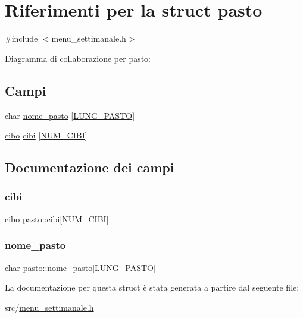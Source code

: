 \hypertarget{structpasto}{}\section{Riferimenti per la struct pasto}
\label{structpasto}


{\ttfamily \#include $<$menu\+\_\+settimanale.\+h$>$}



Diagramma di collaborazione per pasto\+:
\subsection*{Campi}
\begin{DoxyCompactItemize}
\item 
char \hyperlink{structpasto_a64f639335ea116474fb622593a998e94}{nome\+\_\+pasto} \mbox{[}\hyperlink{menu__settimanale_8h_ab1b0c8053eda8a811aae87dd756b1530}{L\+U\+N\+G\+\_\+\+P\+A\+S\+TO}\mbox{]}
\item 
\hyperlink{structcibo}{cibo} \hyperlink{structpasto_a616bde7d807aaa730ddb150de7a96296}{cibi} \mbox{[}\hyperlink{menu__settimanale_8h_a70afbf8b7e7e8486fdec619990ec6073}{N\+U\+M\+\_\+\+C\+I\+BI}\mbox{]}
\end{DoxyCompactItemize}


\subsection{Documentazione dei campi}
\mbox{\label{structpasto_a616bde7d807aaa730ddb150de7a96296}} 
\subsubsection{\texorpdfstring{cibi}{cibi}}
{\footnotesize\ttfamily \hyperlink{structcibo}{cibo} pasto\+::cibi\mbox{[}\hyperlink{menu__settimanale_8h_a70afbf8b7e7e8486fdec619990ec6073}{N\+U\+M\+\_\+\+C\+I\+BI}\mbox{]}}

\mbox{\label{structpasto_a64f639335ea116474fb622593a998e94}} 
\subsubsection{\texorpdfstring{nome\+\_\+pasto}{nome\_pasto}}
{\footnotesize\ttfamily char pasto\+::nome\+\_\+pasto\mbox{[}\hyperlink{menu__settimanale_8h_ab1b0c8053eda8a811aae87dd756b1530}{L\+U\+N\+G\+\_\+\+P\+A\+S\+TO}\mbox{]}}



La documentazione per questa struct è stata generata a partire dal seguente file\+:\begin{DoxyCompactItemize}
\item 
src/\hyperlink{menu__settimanale_8h}{menu\+\_\+settimanale.\+h}\end{DoxyCompactItemize}
